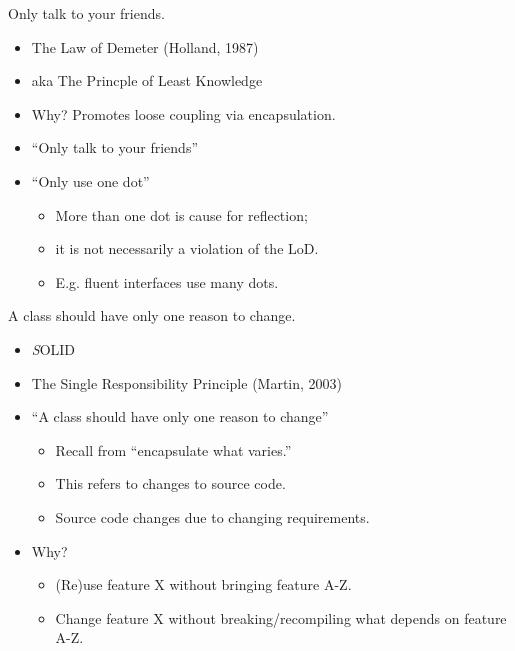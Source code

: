 \documentclass{beamer}
\begin{document}
\begin{frame}{Only talk to your friends.}
    \begin{itemize}
        \item The Law of Demeter (Holland, 1987)
        \item aka The Princple of Least Knowledge
        \item Why? Promotes loose coupling via encapsulation.
        \item ``Only talk to your friends''
        \item ``Only use one dot'' 
            \begin{itemize}
                \item More than one dot is cause for reflection; 
                \item it is not necessarily a violation of the LoD.
                \item E.g. fluent interfaces use many dots.
            \end{itemize}
    \end{itemize}
\end{frame}

\begin{frame}{A class should have only one reason to change.}
    \begin{itemize}
        \item \emph{S}OLID %
        \item The Single Responsibility Principle (Martin, 2003)
        \item ``A class should have only one reason to change''
        \begin{itemize}
            \item Recall from ``encapsulate what varies.''
            \item This refers to changes to source code.
            \item Source code changes due to changing requirements.
        \end{itemize}
    \item Why? 
        \begin{itemize}
            \item (Re)use feature X without bringing feature A-Z.
            \item Change feature X without breaking/recompiling what depends on feature A-Z.
        \end{itemize}
    \end{itemize}
\end{frame}
\end{document}
